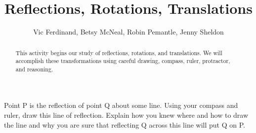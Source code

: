 \documentclass[nooutcomes]{ximera}
\title{Reflections, Rotations, Translations}
\author{Vic Ferdinand, Betsy McNeal, Robin Pemantle, Jenny Sheldon}
\begin{document}
\begin{abstract}This activity begins our study of reflections, rotations, and translations.  We will accomplish these transformations using careful drawing, compass, ruler, protractor, and reasoning.
\end{abstract}
\maketitle



\begin{problem}
Point P is the reflection of point Q about some line.  Using your compass and ruler, draw this line of reflection.  Explain how you knew where and how to draw the line and why you are sure that reflecting Q across this line will put Q on P.\\
\vskip 2in

\vfill
\begin{center}
\end{center}


\vfill


\end{problem}
\end{document}
